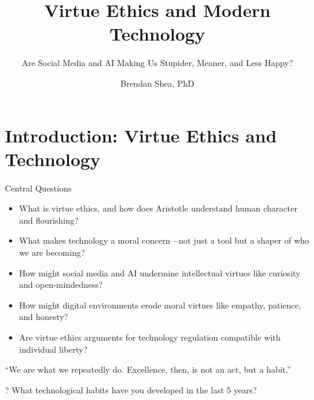 \documentclass[aspectratio=169]{beamer}
\title[Virtue Ethics \& Technology]{Virtue Ethics and Modern Technology}
\subtitle{Are Social Media and AI Making Us Stupider, Meaner, and Less Happy?}
\author{Brendan Shea, PhD}
\institute{Rochester Community and Technical College\\Computing and AI Ethics}
\date{}
\begin{document}
\section{Introduction: Virtue Ethics and Technology}


\begin{frame}
\titlepage
\end{frame}

\begin{frame}{Central Questions}
\begin{itemize}
    \item What is virtue ethics, and how does Aristotle understand human character and flourishing?
    \item What makes technology a moral concern---not just a tool but a shaper of who we are becoming?
    \item How might social media and AI undermine intellectual virtues like curiosity and open-mindedness?
    \item How might digital environments erode moral virtues like empathy, patience, and honesty?
    \item Are virtue ethics arguments for technology regulation compatible with individual liberty?
\end{itemize}

\vspace{0.2cm}
\begin{quotebox}
``We are what we repeatedly do. Excellence, then, is not an act, but a habit.''
\end{quotebox}

\begin{alertblock}{?}
What technological habits have you developed in the last 5 years?
\end{alertblock}
\end{frame}
\end{document}

